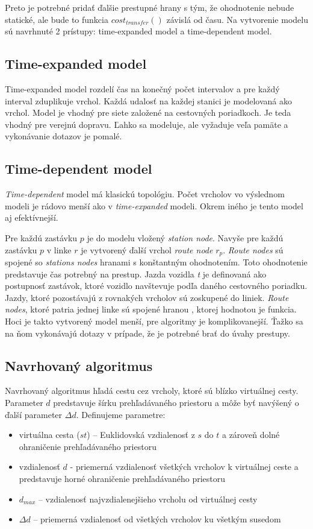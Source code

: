 Preto je potrebné pridať ďalšie prestupné hrany s tým, že ohodnotenie nebude statické, ale bude to funkcia $cost_{transfer}()$ závislá od času. Na vytvorenie modelu sú navrhnuté 2 prístupy: time-expanded model a time-dependent model.

\subsection{Time-expanded model}
Time-expanded model rozdelí čas na konečný počet intervalov a pre každý interval zduplikuje vrchol. Každá udalosť na každej stanici je modelovaná ako vrchol. Model je vhodný pre siete založené na cestovných poriadkoch. Je teda vhodný pre verejnú dopravu. Ľahko sa modeluje, ale vyžaduje veľa pamäte a vykonávanie dotazov je pomalé.

\subsection{Time-dependent model}
\textit{Time-dependent} model má klasickú topológiu. Počet vrcholov vo výslednom modeli je rádovo menší ako v \textit{time-expanded} modeli. Okrem iného je tento model aj efektívnejší. 

Pre každú zastávku $p$ je do modelu vložený \textit{station node}. Navyše pre každú zastávku $p$ v linke $r$ je vytvorený ďalší vrchol \textit{route node} $r_p$. \textit{Route nodes} sú spojené so \textit{stations nodes} hranami s konštantným ohodnotením. Toto ohodnotenie predstavuje čas potrebný na prestup. Jazda vozidla \textit{t} je definovaná ako postupnosť zastávok, ktoré vozidlo navštevuje podľa daného cestovného poriadku. Jazdy, ktoré pozostávajú z rovnakých vrcholov sú zoskupené do liniek. \textit{Route nodes}, ktoré patria jednej linke sú spojené hranou , ktorej hodnotou je funkcia. Hoci je takto vytvorený model menší, pre algoritmy je komplikovanejší. Ťažko sa na ňom vykonávajú dotazy v prípade, že je potrebné brať do úvahy prestupy.


\subsection{Navrhovaný algoritmus}

Navrhovaný algoritmus hľadá cestu cez vrcholy, ktoré sú blízko virtuálnej cesty. Parameter $d$ predstavuje šírku prehľadávaného priestoru a môže byť navýšený o ďalší parameter $\Delta d$. Definujeme parametre:
\begin{itemize}
\item{virtuálna cesta ($st$) – Euklidovská vzdialenosť z $s$ do $t$} a zároveň dolné ohraničenie prehľadávaného priestoru
\item{vzdialenosť $d$ - priemerná vzdialenosť všetkých vrcholov k virtuálnej ceste a predstavuje horné ohraničenie prehľadávaného priestoru}
\item{$d_{max}$ – vzdialenosť najvzdialenejšieho vrcholu od virtuálnej cesty}
\item{$\Delta d$ – priemerná vzdialenosť od všetkých vrcholov ku všetkým susedom}
\end{itemize}

